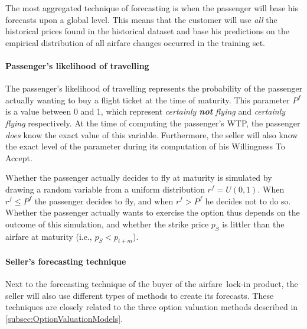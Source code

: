The most aggregated technique of forecasting is when the passenger will base his forecasts upon a global level. This means that the customer will use \emph{all} the historical prices found in the historical dataset and base his predictions on the empirical distribution of all airfare changes occurred in the training set.


\paragraph{Passenger's likelihood of travelling}
The passenger's likelihood of travelling represents the probability of the passenger actually wanting to buy a flight ticket at the time of maturity. This parameter $P^f$ is a value between 0 and 1, which represent \emph{certainly \textbf{not} flying} and \emph{certainly flying} respectively. At the time of computing the passenger's WTP, the passenger \emph{does} know the exact value of this variable. Furthermore, the seller will also know the exact level of the parameter during its computation of his Willingness To Accept.

Whether the passenger actually decides to fly at maturity is simulated by drawing a random variable from a uniform distribution $r^f = U(0,1)$. When $r^f \le P^f$ the passenger decides to fly, and when $r^f > P^f$ he decides not to do so. Whether the passenger actually wants to exercise the option thus depends on the outcome of this simulation, and whether the strike price $p_S$ is littler than the airfare at maturity (i.e., $p_S < p_{t+m}$).

\paragraph{Seller's forecasting technique}
Next to the forecasting technique of the buyer of the airfare~lock-in product, the seller will also use different types of methods to create its forecasts. These techniques are closely related to the three option valuation methods described in \autoref{subsec:OptionValuationModels}.

